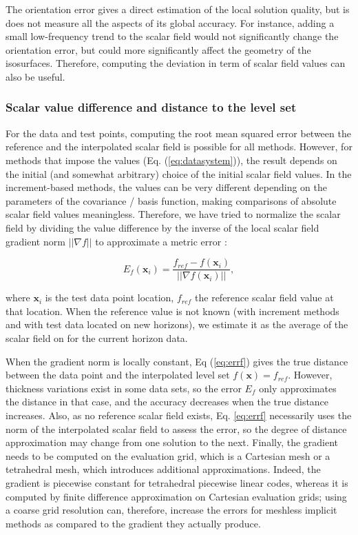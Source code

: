 \documentclass[preprint]{ring20}
\newcommand{\bx}{\mathbf{x}}
\begin{document}
{The orientation error gives a direct estimation of the local solution quality, but is does not measure all the aspects of its global accuracy. For instance, adding a small low-frequency trend to the scalar field would not significantly change the orientation error, but could more significantly affect the geometry of the isosurfaces. Therefore, computing the deviation in term of scalar field values can also be useful. 

\subsubsection{Scalar value difference and distance to the level set}

For the data and test points, computing the root mean squared error between the reference and the interpolated scalar field is possible for all methods. However, for methods that impose the values (Eq. (\ref{eq:datasystem})), the result depends on the initial (and somewhat arbitrary) choice of the initial scalar field values. In the increment-based methods, the values can be very different depending on the parameters of the covariance / basis function, making comparisons of absolute scalar field values meaningless. Therefore, we have tried to normalize the scalar field by dividing the value difference by the inverse of the local scalar field gradient norm $||\nabla f||$ to approximate a metric error \citep{Caumon2010MG}: 

\begin{equation}
\label{eq:errf}
E_f(\bx_i) = \frac{f_{ref} - f(\bx_i)}{||\nabla f(\bx_i)||},
\end{equation}

\noindent where $\bx_i$ is the test data point location, $f_{ref}$ the reference scalar field value at that location. When the reference value is not known (with increment methods and with test data located on new horizons), we estimate it as the average of the scalar field on for the current horizon data. 

When the gradient norm is locally constant, Eq (\ref{eq:errf}) gives the true distance between the data point and the interpolated level set $f(\bx) = f_{ref}$. However, thickness variations exist in some data sets, so the error $E_f$ only approximates the distance in that case, and the accuracy decreases when the true distance increases. Also, as no reference scalar field exists, Eq. \ref{eq:errf} necessarily uses the norm of the interpolated scalar field to assess the error, so the degree of distance approximation may change from one solution to the next. Finally, the gradient needs to be computed on the evaluation grid, which is a Cartesian mesh or a tetrahedral mesh, which introduces additional approximations. Indeed, the gradient is piecewise constant for tetrahedral piecewise linear codes, whereas it is computed by finite difference approximation on Cartesian evaluation grids; using a coarse grid resolution can, therefore, increase the errors for meshless implicit methods as compared to the gradient they actually produce.  

}
\end{document}
